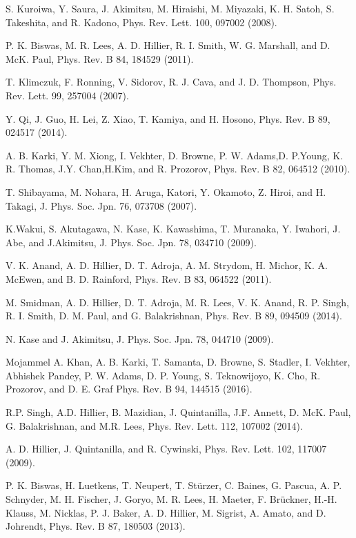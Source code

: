 \documentclass[reprint, superscriptaddress, secnumarabic, amssymb, nobibnotes, aps, prl]{revtex4-1}
\begin{document}
\begin{thebibliography}{References}
 S. Kuroiwa, Y. Saura, J. Akimitsu, M. Hiraishi, M. Miyazaki, K. H. Satoh, S. Takeshita, and R. Kadono, Phys. Rev. Lett. 100, 097002 (2008).

 P. K. Biswas, M. R. Lees, A. D. Hillier, R. I. Smith, W. G. Marshall, and D. McK. Paul, Phys. Rev. B 84, 184529 (2011).

 T. Klimczuk, F. Ronning, V. Sidorov, R. J. Cava, and J. D. Thompson, Phys. Rev. Lett. 99, 257004 (2007).

 Y. Qi, J. Guo, H. Lei, Z. Xiao, T. Kamiya, and H. Hosono, Phys. Rev. B 89, 024517 (2014).

 A. B. Karki, Y. M. Xiong, I. Vekhter, D. Browne, P. W. Adams,D. P.Young, K. R. Thomas, J.Y. Chan,H.Kim, and R. Prozorov, Phys. Rev. B 82, 064512 (2010).

 T. Shibayama, M. Nohara, H. Aruga, Katori, Y. Okamoto, Z. Hiroi, and H. Takagi, J. Phys. Soc. Jpn. 76, 073708 (2007).

 K.Wakui, S. Akutagawa, N. Kase, K. Kawashima, T. Muranaka, Y. Iwahori, J. Abe, and J.Akimitsu, J. Phys. Soc. Jpn. 78, 034710 (2009).

 V. K. Anand, A. D. Hillier, D. T. Adroja, A. M. Strydom, H. Michor, K. A. McEwen, and B. D. Rainford, Phys. Rev. B 83, 064522 (2011).

 M. Smidman, A. D. Hillier, D. T. Adroja, M. R. Lees, V. K. Anand, R. P. Singh, R. I. Smith, D. M. Paul, and G. Balakrishnan, Phys. Rev. B 89, 094509 (2014).

 N. Kase and J. Akimitsu, J. Phys. Soc. Jpn. 78, 044710 (2009).

 Mojammel A. Khan, A. B. Karki, T. Samanta, D. Browne, S. Stadler, I. Vekhter, Abhishek Pandey, P. W. Adams, D. P. Young, S. Teknowijoyo, K. Cho, R. Prozorov, and D. E. Graf Phys. Rev. B 94, 144515 (2016).

 R.P. Singh, A.D. Hillier, B. Mazidian, J. Quintanilla, J.F. Annett, D. McK. Paul, G. Balakrishnan, and M.R. Lees, Phys. Rev. Lett. 112, 107002 (2014).

 A. D. Hillier, J. Quintanilla, and R. Cywinski, Phys. Rev. Lett. 102, 117007 (2009).

 P. K. Biswas, H. Luetkens, T. Neupert, T. Stürzer, C. Baines, G. Pascua, A. P. Schnyder, M. H. Fischer, J. Goryo, M. R. Lees, H. Maeter, F. Brückner, H.-H. Klauss, M. Nicklas, P. J. Baker, A. D. Hillier, M. Sigrist, A. Amato, and D. Johrendt, Phys. Rev. B 87, 180503 (2013).


\end{thebibliography}
\end{document}
